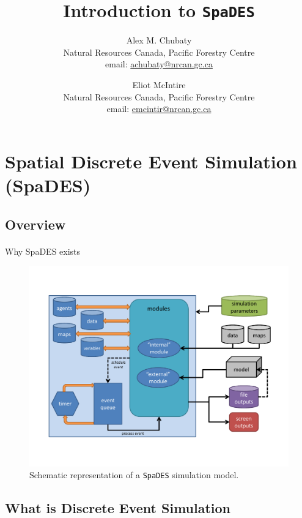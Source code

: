 \documentclass{article}
\title{Introduction to \texttt{SpaDES}}
\author{
  Alex M. Chubaty\\
	\small{Natural Resources Canada, Pacific Forestry Centre}\\
	\small{email: \href{mailto:achubaty@nrcan.gc.ca}{achubaty@nrcan.gc.ca}}
	\and
	Eliot McIntire\\
	\small{Natural Resources Canada, Pacific Forestry Centre}\\
	\small{email: \href{mailto:emcintir@nrcan.gc.ca}{emcintir@nrcan.gc.ca}}
}
\begin{document}


\maketitle

\tableofcontents

\newpage

\section{Spatial Discrete Event Simulation (SpaDES)}

\subsection{Overview}

\paragraph{}
Why SpaDES exists

\begin{figure}[!htbp]
  \centering
	\includegraphics[width=5in]{../inst/SpaDES-overview-diagram.pdf}
	\caption{Schematic representation of a \texttt{SpaDES} simulation model.}
	\label{figure-SpaDES-overview}
\end{figure}

\subsection{What is Discrete Event Simulation}
\end{document}
